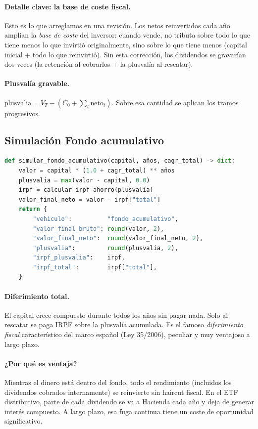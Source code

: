 \documentclass[11pt,a4paper]{book}
\begin{document}
\paragraph{Detalle clave: la base de coste fiscal.} Esto es lo que arreglamos en una revisión. Los netos reinvertidos cada año amplían la \emph{base de coste} del inversor: cuando vende, no tributa sobre todo lo que tiene menos lo que invirtió originalmente, sino sobre lo que tiene menos (capital inicial + todo lo que reinvirtió). Sin esta corrección, los dividendos se gravarían dos veces (la retención al cobrarlos + la plusvalía al rescatar).

\paragraph{Plusvalía gravable.} $\mathrm{plusvalia} = V_T - (C_0 + \sum_t \mathrm{neto}_t)$. Sobre esa cantidad se aplican los tramos progresivos.

\subsection{Simulación Fondo acumulativo}

\begin{lstlisting}[language=Python]
def simular_fondo_acumulativo(capital, años, cagr_total) -> dict:
    valor = capital * (1.0 + cagr_total) ** años
    plusvalia = max(valor - capital, 0.0)
    irpf = calcular_irpf_ahorro(plusvalia)
    valor_final_neto = valor - irpf["total"]
    return {
        "vehiculo":          "fondo_acumulativo",
        "valor_final_bruto": round(valor, 2),
        "valor_final_neto":  round(valor_final_neto, 2),
        "plusvalia":         round(plusvalia, 2),
        "irpf_plusvalia":    irpf,
        "irpf_total":        irpf["total"],
    }
\end{lstlisting}

\paragraph{Diferimiento total.} El capital crece compuesto durante todos los años sin pagar nada. Solo al rescatar se paga IRPF sobre la plusvalía acumulada. Es el famoso \emph{diferimiento fiscal} característico del marco español (Ley 35/2006), peculiar y muy ventajoso a largo plazo.

\paragraph{¿Por qué es ventaja?} Mientras el dinero está dentro del fondo, todo el rendimiento (incluidos los dividendos cobrados internamente) se reinvierte sin haircut fiscal. En el ETF distributivo, parte de cada dividendo se va a Hacienda cada año y deja de generar interés compuesto. A largo plazo, esa fuga continua tiene un coste de oportunidad significativo.
\end{document}
